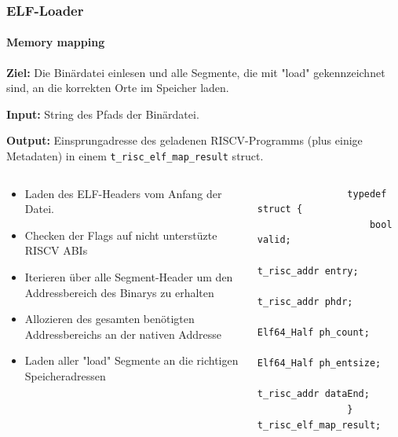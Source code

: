 \documentclass[german]{tum-presentation}
\begin{document}
\begin{frame}[fragile]
	\frametitle{ELF-Loader}
	\framesubtitle{Memory mapping}
	\textbf{Ziel:} Die Binärdatei einlesen und alle Segmente, die mit "load" gekennzeichnet sind, an die korrekten Orte im Speicher laden.

	\vspace{0.25cm}
	\textbf{Input:} String des Pfads der Binärdatei.

	\textbf{Output:} Einsprungadresse des geladenen RISCV-Programms (plus einige Metadaten) in einem \verb!t_risc_elf_map_result! struct.

	\vspace{0.25cm}

	\begin{columns}[onlytextwidth]

		\begin{column}{0.49\textwidth}
			\begin{itemize}
				\item Laden des ELF-Headers vom Anfang der Datei.
				\item Checken der Flags auf nicht unterstüzte RISCV ABIs
				\item Iterieren über alle Segment-Header um den Addressbereich des Binarys zu erhalten
				\item Allozieren des gesamten benötigten Addressbereichs an der nativen Addresse
				\item Laden aller "load" Segmente an die richtigen Speicheradressen
			\end{itemize}
		\end{column}
		\begin{column}{0.49\textwidth}
			\begin{lstlisting}
				typedef struct {
   					bool valid;
    					t_risc_addr entry;
    					t_risc_addr phdr;
    					Elf64_Half ph_count;
    					Elf64_Half ph_entsize;
    					t_risc_addr dataEnd;
				} t_risc_elf_map_result;
			\end{lstlisting}
		\end{column}
	\end{columns}
\end{frame}
\end{document}
